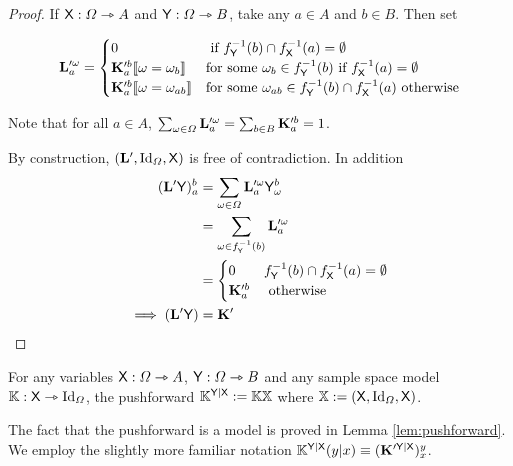 \begin{proof}
If $\mathsf{X}:\Omega\rightarrowtriangle A$ and $\mathsf{Y}:\Omega\rightarrowtriangle B$, take any $a\in A$ and $b\in B$. Then set

\begin{align}
	\mathbf{L}_a^{\prime \omega} = \begin{cases}
					0 & \text{ if } f_{\mathsf{Y}}^{-1}(b)\cap f_{\mathsf{X}}^{-1}(a)=\emptyset\\
					\mathbf{K}_a^{\prime b} \llbracket \omega = \omega_b \rrbracket & \text{for some }\omega_b\in f_{\mathsf{Y}}^{-1}(b) \text{ if }f_{\mathsf{X}}^{-1}(a)=\emptyset\\
					\mathbf{K}_a^{\prime b} \llbracket \omega = \omega_{ab} \rrbracket & \text{for some }\omega_{ab}\in f_{\mathsf{Y}}^{-1}(b)\cap f_{\mathsf{X}}^{-1}(a)\text{ otherwise}\\
					\end{cases}
\end{align}

Note that for all $a\in A$, $\sum_{\omega\in \Omega}\mathbf{L}^{\prime\omega}_a = \sum_{b\in B} \mathbf{K}_a^{\prime b} = 1$.

By construction, $(\mathbf{L}',\text{Id}_\Omega,\mathsf{X})$ is free of contradiction. In addition
\begin{align}
	(\mathbf{L}'\mathsf{Y})_a^b &= \sum_{\omega\in \Omega} \mathbf{L}^{\prime \omega}_a \mathsf{Y}_\omega^b\\
							&= \sum_{\omega\in f_{\mathsf{Y}}^{-1}(b)} \mathbf{L}_a^{\prime \omega}\\
							&= \begin{cases}
							 0 & f_{\mathsf{Y}}^{-1}(b)\cap f_{\mathsf{X}}^{-1}(a)=\emptyset\\
							 \mathbf{K}_a^{\prime b} & \text{ otherwise }
							\end{cases}\\
		\implies (\mathbf{L}'\mathsf{Y}) &= \mathbf{K}'
\end{align}
\end{proof}

\begin{definition}
For any variables $\mathsf{X}:\Omega\rightarrowtriangle A$, $\mathsf{Y}:\Omega\rightarrowtriangle B$ and any sample space model $\mathbb{K}:\mathsf{X}\rightarrowtriangle \mathrm{Id}_\Omega$, the pushforward $\mathbb{K}^{\mathsf{Y}|\mathsf{X}}:= \mathbb{K}\mathbb{X}$ where $\mathbb{X}:=(\mathsf{X},\mathrm{Id}_\Omega,\mathsf{X})$.
\end{definition}

The fact that the pushforward is a model is proved in Lemma \ref{lem:pushforward}. We employ the slightly more familiar notation $\mathbb{K}^{\mathsf{Y}|\mathsf{X}}(y|x)\equiv (\mathbf{K}^{\prime \mathsf{Y}|\mathsf{X}})^y_x$.

